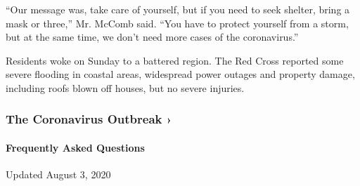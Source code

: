 ``Our message was, take care of yourself, but if you need to seek
shelter, bring a mask or three,'' Mr. McComb said. ``You have to protect
yourself from a storm, but at the same time, we don't need more cases of
the coronavirus.''

Residents woke on Sunday to a battered region. The Red Cross reported
some severe flooding in coastal areas, widespread power outages and
property damage, including roofs blown off houses, but no severe
injuries.

\href{https://www.nytimes.com/news-event/coronavirus?action=click\&pgtype=Article\&state=default\&region=MAIN_CONTENT_3\&context=storylines_faq}{}

\hypertarget{the-coronavirus-outbreak-}{%
\subsubsection{The Coronavirus Outbreak
›}\label{the-coronavirus-outbreak-}}

\hypertarget{frequently-asked-questions}{%
\paragraph{Frequently Asked
Questions}\label{frequently-asked-questions}}

Updated August 3, 2020

